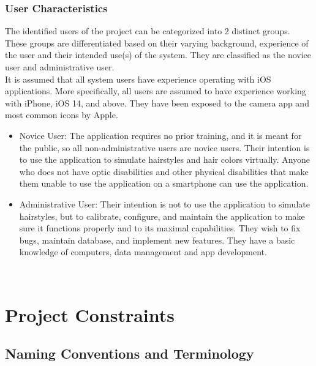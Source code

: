 \documentclass[12pt]{article}
\begin{document}
\subsubsection{User Characteristics}
The identified users of the project can be categorized into 2 distinct groups. These groups are differentiated based on their varying background, experience of the user and their intended use(s) of the system. They are classified as the novice user and administrative user. \\
\newline
\noindent
It is assumed that all system users have experience operating with iOS applications. More specifically, all users are assumed to have experience working with iPhone, iOS 14, and above. They have been exposed to the camera app and most common icons by Apple.
\begin{itemize}
    \item Novice User: The application requires no prior training, and it is meant for the public, so all non-administrative users are novice users. Their intention is to use the application to simulate hairstyles and hair colors virtually. Anyone who does not have optic disabilities and other physical disabilities that make them unable to use the application on a smartphone can use the application.
    \item Administrative User: Their intention is not to use the application to simulate hairstyles, but to calibrate, configure, and maintain the application to make sure it functions properly and to its maximal capabilities. They wish to fix bugs, maintain database, and implement new features. They have a basic knowledge of computers, data management and app development.
    
\end{itemize}

~\newpage

\section{Project Constraints}

\subsection{Naming Conventions and Terminology}
\end{document}
